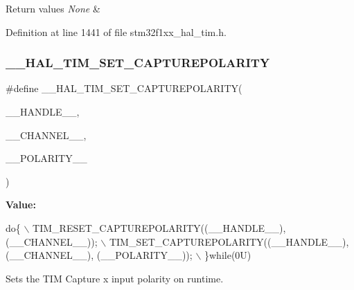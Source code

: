 \begin{DoxyRetVals}{Return values}
{\em None} & \\
\hline
\end{DoxyRetVals}


Definition at line 1441 of file stm32f1xx\+\_\+hal\+\_\+tim.\+h.

\mbox{\label{group___t_i_m___exported___macros_gac5d6989516caa67fae23a9329228cdc7}} 
\subsubsection{\texorpdfstring{\+\_\+\+\_\+\+H\+A\+L\+\_\+\+T\+I\+M\+\_\+\+S\+E\+T\+\_\+\+C\+A\+P\+T\+U\+R\+E\+P\+O\+L\+A\+R\+I\+TY}{\_\_HAL\_TIM\_SET\_CAPTUREPOLARITY}}
{\footnotesize\ttfamily \#define \+\_\+\+\_\+\+H\+A\+L\+\_\+\+T\+I\+M\+\_\+\+S\+E\+T\+\_\+\+C\+A\+P\+T\+U\+R\+E\+P\+O\+L\+A\+R\+I\+TY(\begin{DoxyParamCaption}\item[{}]{\+\_\+\+\_\+\+H\+A\+N\+D\+L\+E\+\_\+\+\_\+,  }\item[{}]{\+\_\+\+\_\+\+C\+H\+A\+N\+N\+E\+L\+\_\+\+\_\+,  }\item[{}]{\+\_\+\+\_\+\+P\+O\+L\+A\+R\+I\+T\+Y\+\_\+\+\_\+ }\end{DoxyParamCaption})}

{\bfseries Value\+:}
\begin{DoxyCode}
\textcolor{keywordflow}{do}\{                                                                     \(\backslash\)
          TIM\_RESET\_CAPTUREPOLARITY((\_\_HANDLE\_\_), (\_\_CHANNEL\_\_));               \(\backslash\)
          TIM\_SET\_CAPTUREPOLARITY((\_\_HANDLE\_\_), (\_\_CHANNEL\_\_), (\_\_POLARITY\_\_)); \(\backslash\)
        \}\textcolor{keywordflow}{while}(0U)
\end{DoxyCode}


Sets the T\+IM Capture x input polarity on runtime. 


